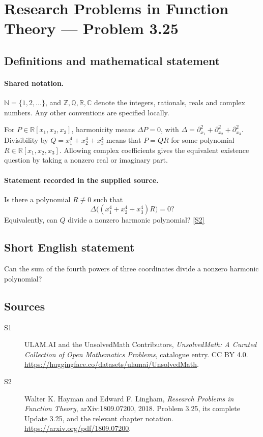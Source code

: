 \documentclass[11pt]{book}
\newcommand{\sref}[2]{\hyperlink{source:#1:#2}{[S#2]}}
\begin{document}
\section{Research Problems in Function Theory — Problem 3.25}\label{statement}

\subsection{Definitions and mathematical statement}

\paragraph{Shared notation.}$\mathbb N=\{1,2,\ldots\}$, and $\mathbb Z,\mathbb Q,\mathbb R,\mathbb C$ denote the integers, rationals, reals and complex numbers. Any other conventions are specified locally.


For $P\in\mathbb R[x_1,x_2,x_3]$, harmonicity means $\Delta P=0$, with $\Delta=\partial_{x_1}^2+\partial_{x_2}^2+\partial_{x_3}^2$. Divisibility by $Q=x_1^4+x_2^4+x_3^4$ means that $P=QR$ for some polynomial $R\in\mathbb R[x_1,x_2,x_3]$. Allowing complex coefficients gives the equivalent existence question by taking a nonzero real or imaginary part.
\paragraph{Statement recorded in the supplied source.}
Is there a polynomial $R\not\equiv0$ such that
\[\Delta\bigl((x_1^4+x_2^4+x_3^4)R\bigr)=0?\]
Equivalently, can $Q$ divide a nonzero harmonic polynomial? \sref{statement}{2}
\subsection{Short English statement}
Can the sum of the fourth powers of three coordinates divide a nonzero harmonic polynomial?
\subsection{Sources}
\begin{description}
\item[\hypertarget{source:statement:1}{S1}] ULAM.AI and the UnsolvedMath Contributors, \emph{UnsolvedMath: A Curated Collection of Open Mathematics Problems}, catalogue entry. CC BY 4.0. \url{https://huggingface.co/datasets/ulamai/UnsolvedMath}.
\item[\hypertarget{source:statement:2}{S2}] Walter K. Hayman and Edward F. Lingham, \emph{Research Problems in Function Theory}, arXiv:1809.07200, 2018. Problem 3.25, its complete Update 3.25, and the relevant chapter notation. \url{https://arxiv.org/pdf/1809.07200}.
\end{description}
\label{end:statement}
\end{document}
